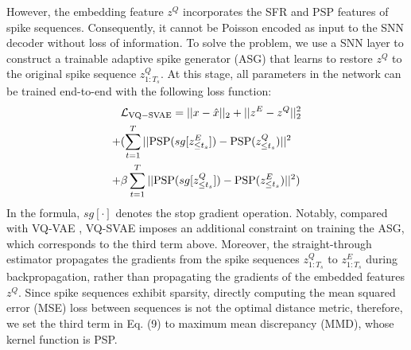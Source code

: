\documentclass{article}
\begin{document}
However, the embedding feature $z^Q$ incorporates the SFR and PSP features of spike sequences. Consequently, it cannot be Poisson encoded \cite{b55} as input to the SNN decoder without loss of information. To solve the problem, we use a SNN layer to construct a trainable adaptive spike generator (ASG) that learns to restore $z^Q$ to the original spike sequence $z^Q_{1:T_s}$. At this stage, all parameters in the network can be trained end-to-end with the following loss function:
\begin{equation}
\begin{aligned}
&\mathcal L_{{\rm{VQ-SVAE}}}=||x-\hat{x}||_2+||z^E-z^Q||^2_2\\
+&(\sum^{T}_{t=1}||{\rm{PSP}}(sg[z_{\leq t_s}^E])-{\rm{PSP}}(z^Q_{\leq t_s})||^2\\
+&\beta\sum^{T}_{t=1}||{\rm{PSP}}(sg[z_{\leq t_s}^Q])-{\rm{PSP}}(z^E_{\leq t_s})||^2)
\end{aligned}
\end{equation}
In the formula, $sg[\cdot]$ denotes the stop gradient operation. Notably, compared with VQ-VAE \cite{b3}, VQ-SVAE imposes an additional constraint on training the ASG, which corresponds to the third term above. Moreover, the straight-through estimator propagates the gradients from the spike sequences $z_{1:T_s}^Q$ to $z_{1:T_s}^E$ during backpropagation, rather than propagating the gradients of the embedded features $z^Q$. Since spike sequences exhibit sparsity, directly computing the mean squared error (MSE) loss between sequences is not the optimal distance metric, therefore, we set the third term in Eq. (9) to maximum mean discrepancy (MMD), whose kernel function is PSP.
\end{document}
